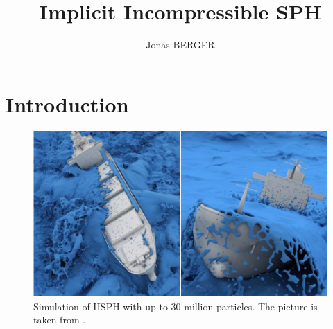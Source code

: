 \documentclass[acmtog, authorversion]{acmart}
\begin{document}
\fancyfoot{}


\title{Implicit Incompressible SPH}
\author{Jonas BERGER}


\renewcommand{\shortauthors}{Jonas Berger}

\begin{abstract}
\end{abstract}





\maketitle
\thispagestyle{empty}
\section{Introduction}

\begin{figure}
    \centering
    \includegraphics[width=\linewidth]{article_rendering.png}
    \caption{Simulation of IISPH with up to 30 million particles. The picture is taken from \cite{IISPH}.}
    \label{fig:IISPH_article}
\end{figure}
\end{document}

